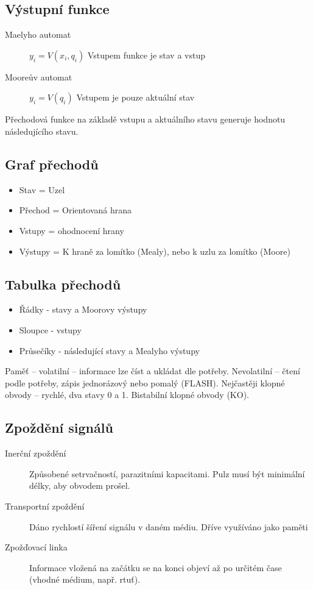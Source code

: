 \documentclass[a4paper, 11pt]{report}
\begin{document}
\subsection{Výstupní funkce}
\begin{description}
	\item[Maelyho automat] $y_i = V(x_i, q_i)$ Vstupem funkce je stav a vstup
	\item[Mooreův automat] $y_i = V(q_i)$ Vstupem je pouze aktuální stav
\end{description}

Přechodová funkce na základě vstupu a aktuálního stavu generuje hodnotu následujícího stavu.

\subsection{Graf přechodů}

\begin{itemize}
	\item Stav = Uzel
	\item Přechod = Orientovaná hrana
	\item Vstupy = ohodnocení hrany
	\item Výstupy = K hraně za lomítko (Mealy), nebo k uzlu za lomítko (Moore)
\end{itemize}

\subsection{Tabulka přechodů}

\begin{itemize}
	\item Řádky - stavy a Moorovy výstupy
	\item Sloupce - vstupy
	\item Průsečíky - následující stavy a Mealyho výstupy
\end{itemize}

Paměť -- volatilní -- informace lze číst a ukládat dle potřeby. Nevolatilní -- čtení podle potřeby, zápis jednorázový nebo pomalý (FLASH). Nejčastěji klopné obvody -- rychlé, dva stavy 0 a 1. Bistabilní klopné obvody (KO).

\subsection{Zpoždění signálů}

\begin{description}
	\item[Inerční zpoždění] Způsobené setrvačností, parazitními kapacitami. Pulz musí být minimální délky, aby obvodem prošel.
	\item[Transportní zpoždění] Dáno rychlostí šíření signálu v daném médiu. Dříve využíváno jako paměti
	\item[Zpožďovací linka] Informace vložená na začátku se na konci objeví až po určitém čase  (vhodné médium, např. rtuť).
\end{description}
\end{document}
